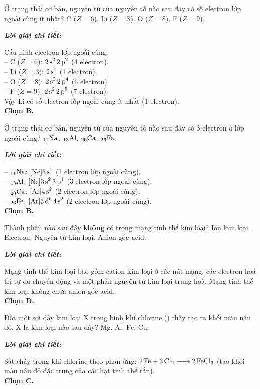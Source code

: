 \documentclass[11pt,a4paper]{article}
\def\loigiai#1{
\par\begingroup\color{blue!80!black}\small
\noindent\textbf{\textit{Lời giải chi tiết:}}\par
#1\par\endgroup}
\begin{document}
\begin{ex}
Ở trạng thái cơ bản, nguyên tử của nguyên tố nào sau đây có số electron lớp ngoài cùng ít nhất?
\choice
{C ($Z = 6$).}
{\True Li ($Z = 3$).}
{O ($Z = 8$).}
{F ($Z = 9$).}
\loigiai{
Cấu hình electron lớp ngoài cùng:\\
-- C ($Z = 6$): $\ce{2s^2 2p^2}$ (4 electron).\\
-- Li ($Z = 3$): $\ce{2s^1}$ (1 electron).\\
-- O ($Z = 8$): $\ce{2s^2 2p^4}$ (6 electron).\\
-- F ($Z = 9$): $\ce{2s^2 2p^5}$ (7 electron).\\
Vậy Li có số electron lớp ngoài cùng ít nhất (1 electron).\\
\textbf{Chọn B.}}
\end{ex}

\begin{ex}
Ở trạng thái cơ bản, nguyên tử của nguyên tố nào sau đây có 3 electron ở lớp ngoài cùng?
\choice
{$_{11}\ce{Na}$.}
{\True $_{13}\ce{Al}$.}
{$_{20}\ce{Ca}$.}
{$_{26}\ce{Fe}$.}
\loigiai{
-- $_{11}\ce{Na}$: $[\ce{Ne}] \ce{3s^1}$ (1 electron lớp ngoài cùng).\\
-- $_{13}\ce{Al}$: $[\ce{Ne}] \ce{3s^2 3p^1}$ (3 electron lớp ngoài cùng).\\
-- $_{20}\ce{Ca}$: $[\ce{Ar}] \ce{4s^2}$ (2 electron lớp ngoài cùng).\\
-- $_{26}\ce{Fe}$: $[\ce{Ar}] \ce{3d^6 4s^2}$ (2 electron lớp ngoài cùng).\\
\textbf{Chọn B.}}
\end{ex}

\begin{ex}
Thành phần nào sau đây \textbf{không} có trong mạng tinh thể kim loại?
\choice
{Ion kim loại.}
{Electron.}
{Nguyên tử kim loại.}
{\True Anion gốc acid.}
\loigiai{
Mạng tinh thể kim loại bao gồm cation kim loại ở các nút mạng, các electron hoá trị tự do chuyển động và một phần nguyên tử kim loại trung hoà. Mạng tinh thể kim loại không chứa anion gốc acid.\\
\textbf{Chọn D.}}
\end{ex}

\begin{ex}
Đốt một sợi dây kim loại X trong bình khí chlorine () thấy tạo ra khói màu nâu đỏ. X là kim loại nào sau đây?
\choice
{Mg.}
{Al.}
{\True Fe.}
{Cu.}
\loigiai{
Sắt cháy trong khí chlorine theo phản ứng: $\ce{2Fe + 3Cl2 -> 2FeCl3}$ (tạo khói màu nâu đỏ đặc trưng của các hạt tinh thể \ce{FeCl3} rắn).\\
\textbf{Chọn C.}}
\end{ex}
\end{document}
